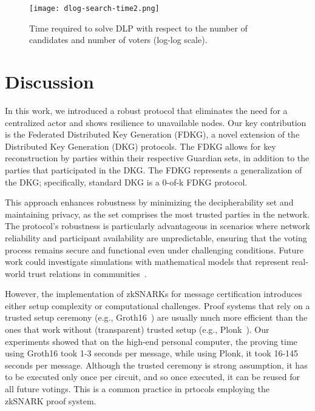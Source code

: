 \documentclass[runningheads]{llncs}
\begin{document}

\begin{figure}[H]
    \centering
    \texttt{[image: dlog-search-time2.png]}
    \caption{Time required to solve DLP with respect to the number of candidates and number of voters (log-log scale).}
    \label{fig:dlog-search}
\end{figure}


\section{Discussion}

In this work, we introduced a robust protocol that eliminates the need for a centralized actor and shows resilience to unavailable nodes. Our key contribution is the Federated Distributed Key Generation (FDKG), a novel extension of the Distributed Key Generation (DKG) protocols. The FDKG allows for key reconstruction by parties within their respective Guardian sets, in addition to the parties that participated in the DKG. The FDKG represents a generalization of the DKG; specifically, standard DKG is a 0-of-k FDKG protocol. 


This approach enhances robustness by minimizing the decipherability set and maintaining privacy, as the set comprises the most trusted parties in the network. The protocol's robustness is particularly advantageous in scenarios where network reliability and participant availability are unpredictable, ensuring that the voting process remains secure and functional even under challenging conditions. Future work could investigate simulations with mathematical models that represent real-world trust relations in communities~\cite{healdMathematicalDescriptionTrust2019}.

However, the implementation of zkSNARKs for message certification introduces either setup complexity or computational challenges. Proof systems that rely on a trusted setup ceremony (e.g., Groth16~\cite{grothSizePairingbasedNoninteractive2016}) are usually much more efficient than the ones that work without (transparent) trusted setup (e.g., Plonk~\cite{gabizonPlonkPermutationsLagrangebases2019a}). Our experiments showed that on the high-end personal computer, the proving time using Groth16 took 1-3 seconds per message, while using Plonk, it took 16-145 seconds per message. Although the trusted ceremony is strong assumption, it has to be executed only once per circuit, and so once executed, it can be reused for all future votings. This is a common practice in prtocols employing the zkSNARK proof system.
\end{document}

